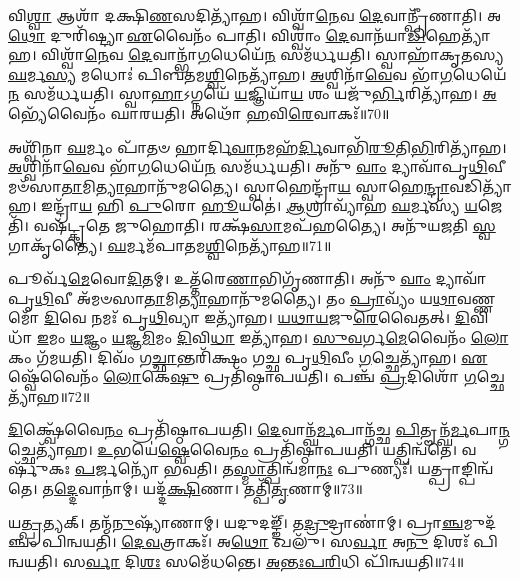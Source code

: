 𑌵𑌿\-\ul{𑌶𑍍𑌵𑌾} 𑌆𑌶𑌾᳴ 𑌦𑌕𑍍𑌷𑌿\-\ul{𑌣}\-𑌸𑌦𑌿𑌤𑍍𑌯𑌾᳴𑌹। 
𑌵𑌿𑌶𑍍𑌵𑌾᳴\-\ul{𑌨𑍇}\-𑌵 \ul{𑌦𑍇}\-𑌵𑌾𑌨𑍍𑌪𑍍𑌰𑍀᳴𑌣𑌾𑌤𑌿। 
𑌅\-\ul{𑌥𑍋} 𑌦𑍁𑌰𑌿᳴𑌷𑍍𑌟𑍍𑌯𑌾 \ul{𑌏}\-𑌵𑍈𑌨𑌂᳴ 𑌪𑌾𑌤𑌿। 
𑌵𑌿𑌶𑍍𑌵𑌾𑌂॑ \ul{𑌦𑍇}\-𑌵𑌾𑌨᳴𑌯𑌾\-\ul{𑌡𑌿}\-𑌹𑍇𑌤𑍍𑌯𑌾᳴𑌹। 
𑌵𑌿𑌶𑍍𑌵𑌾᳴\-\ul{𑌨𑍇}\-𑌵 \ul{𑌦𑍇}\-𑌵𑌾𑌨𑍍𑌭𑌾᳴\-\ul{𑌗}\-𑌧𑍇𑌯𑍇᳴\-\ul{𑌨} 𑌸𑌮᳴𑌰𑍍𑌧𑌯𑌤𑌿। 
𑌸𑍍𑌵𑌾𑌹𑌾᳴𑌕𑍃𑌤𑌸𑍍𑌯 \ul{𑌘}\-𑌰𑍍𑌮\-\ul{𑌸𑍍𑌯} 𑌮𑌧𑍋𑌃॑ 𑌪𑌿𑌬𑌤𑌮\-\ul{𑌶𑍍𑌵𑌿}\-𑌨𑍇𑌤𑍍𑌯𑌾᳴𑌹। 
\-\ul{𑌅}\-𑌶𑍍𑌵𑌿𑌨𑌾᳴\-\ul{𑌵𑍇}\-𑌵 𑌭𑌾᳴\-\ul{𑌗}\-𑌧𑍇𑌯𑍇᳴\-\ul{𑌨} 𑌸𑌮᳴𑌰𑍍𑌧𑌯𑌤𑌿। 
𑌸𑍍𑌵𑌾\-\ul{𑌹𑌾}\-𑌽𑌗𑍍𑌨𑌯𑍇᳴ \ul{𑌯}\-𑌜𑍍𑌞𑌿𑌯𑌾᳴\-\ul{𑌯} 𑌶𑌂 𑌯𑌜𑍁᳴\-\ul{𑌰𑍍𑌭𑌿}\-𑌰𑌿𑌤𑍍𑌯𑌾᳴𑌹। 
\-\ul{𑌅}\-𑌭𑍍𑌯𑍇᳴𑌵𑍈𑌨𑌂᳴ 𑌘𑌾𑌰𑌯𑌤𑌿। 
𑌅𑌥𑍋᳴ \ul{𑌹}\-𑌵𑌿\-\ul{𑌰𑍇}\-𑌵𑌾𑌕𑌃᳴॥70॥

𑌅𑌶𑍍𑌵𑌿᳴𑌨𑌾 \ul{𑌘}\-𑌰𑍍𑌮𑌂 𑌪𑌾᳴𑌤𑍞 𑌹𑌾𑌰𑍍𑌦𑌿\-\ul{𑌵𑌾}\-𑌨𑌮𑌹᳴\-\ul{𑌰𑍍𑌦𑌿}\-𑌵𑌾𑌭𑌿᳴\-\ul{𑌰𑍂}\-𑌤𑌿\-\ul{𑌭𑌿}\-𑌰𑌿𑌤𑍍𑌯𑌾᳴𑌹। 
\-\ul{𑌅}\-𑌶𑍍𑌵𑌿𑌨𑌾᳴\-\ul{𑌵𑍇}\-𑌵 𑌭𑌾᳴\-\ul{𑌗}\-𑌧𑍇𑌯𑍇᳴\-\ul{𑌨} 𑌸𑌮᳴𑌰𑍍𑌧𑌯𑌤𑌿। 
𑌅𑌨𑍁᳴ \ul{𑌵𑌾𑌂} 𑌦𑍍𑌯𑌾𑌵𑌾᳴𑌪𑍃\-\ul{𑌥𑌿}\-𑌵𑍀 𑌮𑍞᳴𑌸𑌾\-\ul{𑌤𑌾}\-𑌮𑌿\-\ul{𑌤𑍍𑌯𑌾}\-𑌹𑌾𑌨𑍁᳴𑌮𑌤𑍍𑌯𑍈। 
𑌸𑍍𑌵𑌾𑌹𑍇𑌨𑍍𑌦𑍍𑌰𑌾᳴\-\ul{𑌯} 𑌸𑍍𑌵𑌾𑌹𑍇\-\ul{𑌨𑍍𑌦𑍍𑌰𑌾}\-𑌵𑌡𑌿𑌤𑍍𑌯𑌾᳴𑌹। 
𑌇𑌨𑍍𑌦𑍍𑌰𑌾᳴\-\ul{𑌯} 𑌹𑌿 \ul{𑌪𑍁}\-𑌰𑍋 \ul{𑌹𑍂}\-𑌯𑌤𑍇॑। 
\-\ul{𑌆}\-𑌶𑍍𑌰𑌾𑌵𑍍𑌯𑌾᳴𑌹 \ul{𑌘}\-𑌰𑍍𑌮𑌸𑍍𑌯᳴ \ul{𑌯}\-𑌜𑍇𑌤𑌿᳴। 
𑌵𑌷᳴𑌟𑍍𑌕𑍃𑌤𑍇 𑌜𑍁𑌹𑍋𑌤𑌿। 
𑌰𑌕𑍍𑌷᳴\-\ul{𑌸𑌾}\-𑌮𑌪᳴𑌹𑌤𑍍𑌯𑍈। 
𑌅𑌨𑍁᳴𑌯𑌜𑌤𑌿 \ul{𑌸𑍍𑌵}\-𑌗𑌾𑌕𑍃᳴𑌤𑍍𑌯𑍈। 
\-\ul{𑌘}\-𑌰𑍍𑌮𑌮᳴𑌪𑌾𑌤𑌮\-\ul{𑌶𑍍𑌵𑌿}\-𑌨𑍇𑌤𑍍𑌯𑌾᳴𑌹॥71॥

𑌪𑍂𑌰𑍍𑌵᳴\-\ul{𑌮𑍇}\-𑌵𑍋\-\ul{𑌦𑌿}\-𑌤𑌮𑍍। 
𑌉𑌤𑍍𑌤᳴𑌰𑍇\-\ul{𑌣𑌾}\-𑌭𑌿𑌗𑍃᳴𑌣𑌾𑌤𑌿। 
𑌅𑌨𑍁᳴ \ul{𑌵𑌾𑌂} 𑌦𑍍𑌯𑌾𑌵𑌾᳴𑌪𑍃\-\ul{𑌥𑌿}\-𑌵𑍀 𑌅᳴𑌮𑍞𑌸𑌾\-\ul{𑌤𑌾}\-𑌮𑌿\-\ul{𑌤𑍍𑌯𑌾}\-𑌹𑌾𑌨𑍁᳴𑌮𑌤𑍍𑌯𑍈। 
𑌤𑌂 \ul{𑌪𑍍𑌰𑌾}\-𑌵𑍍𑌯𑌂᳴ 𑌯\-\ul{𑌥𑌾}\-𑌵𑌣𑍍𑌣𑌮𑍋᳴ \ul{𑌦𑌿}\-𑌵𑍇 𑌨𑌮𑌃᳴ 𑌪𑍃\-\ul{𑌥𑌿}\-𑌵𑍍𑌯𑌾 𑌇𑌤𑍍𑌯𑌾᳴𑌹। 
\-\ul{𑌯}\-\-\ul{𑌥𑌾}\-\-\ul{𑌯}\-𑌜𑍁\-\ul{𑌰𑍇}\-𑌵𑍈𑌤𑌤𑍍। 
\-\ul{𑌦𑌿}\-𑌵𑌿𑌧𑌾᳴ \ul{𑌇}\-𑌮𑌂 \ul{𑌯}\-𑌜𑍍𑌞𑌂 \ul{𑌯}\-𑌜𑍍𑌞\-\ul{𑌮𑌿}\-𑌮𑌂 \ul{𑌦𑌿}\-𑌵𑌿\-\ul{𑌧𑌾} 𑌇𑌤𑍍𑌯𑌾᳴𑌹। 
\-\ul{𑌸𑍁}\-\-\ul{𑌵}\-𑌰𑍍𑌗\-\ul{𑌮𑍇}\-𑌵𑍈𑌨𑌂᳴ \ul{𑌲𑍋}\-𑌕𑌂 𑌗᳴𑌮𑌯𑌤𑌿। 
𑌦𑌿𑌵𑌂᳴ 𑌗\-\ul{𑌚𑍍𑌛𑌾}\-𑌨𑍍𑌤𑌰𑌿᳴𑌕𑍍𑌷𑌂 𑌗𑌚𑍍𑌛 𑌪𑍃\-\ul{𑌥𑌿}\-𑌵𑍀𑌂 \ul{𑌗}\-𑌚𑍍𑌛𑍇𑌤𑍍𑌯𑌾᳴𑌹। 
\-\ul{𑌏}\-𑌷𑍍𑌵𑍇᳴𑌵𑍈𑌨𑌂᳴ \ul{𑌲𑍋}\-𑌕𑍇\-\ul{𑌷𑍁} 𑌪𑍍𑌰𑌤𑌿᳴𑌷𑍍𑌠𑌾𑌪𑌯𑌤𑌿। 
𑌪𑌞𑍍𑌚᳴ \ul{𑌪𑍍𑌰}\-𑌦𑌿𑌶𑍋᳴ \ul{𑌗}\-𑌚𑍍𑌛𑍇𑌤𑍍𑌯𑌾᳴𑌹॥72॥

\-\ul{𑌦𑌿}\-𑌕𑍍𑌷𑍍𑌵𑍇᳴𑌵𑍈\-\ul{𑌨𑌂} 𑌪𑍍𑌰𑌤𑌿᳴𑌷𑍍𑌠𑌾𑌪𑌯𑌤𑌿। 
\-\ul{𑌦𑍇}\-𑌵𑌾𑌨𑍍𑌘᳴\-\ul{𑌰𑍍𑌮}\-𑌪𑌾𑌨𑍍𑌗᳴𑌚𑍍𑌛 \ul{𑌪𑌿}\-𑌤𑍄𑌨𑍍𑌘᳴\-\ul{𑌰𑍍𑌮}\-\-𑌪𑌾\-\ul{𑌨𑍍𑌗}\-𑌚𑍍𑌛𑍇\-𑌤𑍍𑌯𑌾᳴𑌹। 
\-\ul{𑌉}\-𑌭𑌯𑍇॑\-\ul{𑌷𑍍𑌵𑍇}\-𑌵𑍈\-\ul{𑌨𑌂} 𑌪𑍍𑌰𑌤𑌿᳴𑌷𑍍𑌠𑌾𑌪𑌯𑌤𑌿। 
𑌯𑌤𑍍𑌪𑌿𑌨𑍍𑌵᳴𑌤𑍇। 
𑌵𑌰𑍍\mbox{}𑌷𑍁᳴𑌕𑌃 \ul{𑌪}\-𑌰𑍍𑌜𑌨𑍍𑌯𑍋᳴ 𑌭𑌵𑌤𑌿। 
𑌤\-\ul{𑌸𑍍𑌮𑌾}\-𑌤𑍍𑌪𑌿𑌨𑍍𑌵᳴𑌮𑌾\-\ul{𑌨𑌃} 𑌪𑍁𑌣𑍍𑌯𑌃᳴। 
𑌯𑌤𑍍𑌪𑍍𑌰𑌾𑌙𑍍𑌪𑌿𑌨𑍍𑌵᳴𑌤𑍇। 
𑌤\-\ul{𑌦𑍍𑌦𑍇}\-𑌵𑌾𑌨𑌾॑𑌮𑍍। 
𑌯𑌦𑍍𑌦᳴\-\ul{𑌕𑍍𑌷𑌿}\-𑌣𑌾। 
𑌤𑌤𑍍𑌪𑌿᳴\-\ul{𑌤𑍃}\-𑌣𑌾𑌮𑍍॥73॥

𑌯\-\ul{𑌤𑍍𑌪𑍍𑌰}\-𑌤𑍍𑌯𑌕𑍍। 
𑌤𑌨𑍍𑌮᳴\-\ul{𑌨𑍁}\-𑌷𑍍𑌯𑌾᳴𑌣𑌾𑌮𑍍। 
𑌯𑌦𑍁𑌦𑌙𑍍𑌙𑍍᳴। 
𑌤\-\ul{𑌦𑍍𑌰𑍁}\-𑌦𑍍𑌰𑌾𑌣𑌾॑𑌮𑍍। 
𑌪𑍍𑌰𑌾\-\ul{𑌞𑍍𑌚}\-𑌮𑍁𑌦᳴𑌞𑍍𑌚𑌂 𑌪𑌿𑌨𑍍𑌵𑌯𑌤𑌿। 
\-\ul{𑌦𑍇}\-\-\ul{𑌵}\-𑌤𑍍𑌰𑌾𑌕𑌃᳴। 
𑌅\-\ul{𑌥𑍋} 𑌖𑌲𑍁᳴। 
𑌸\-\ul{𑌰𑍍𑌵𑌾} 𑌅\-\ul{𑌨𑍁} 𑌦𑌿𑌶𑌃᳴ 𑌪𑌿𑌨𑍍𑌵𑌯𑌤𑌿। 
𑌸\-\ul{𑌰𑍍𑌵𑌾} 𑌦𑌿\-\ul{𑌶𑌃} 𑌸𑌮𑍇᳴𑌧𑌨𑍍𑌤𑍇। 
\-\ul{𑌅}\-\-\ul{𑌨𑍍𑌤𑌃}\-\-\ul{𑌪}\-\-\ul{𑌰𑌿}\-𑌧𑌿 𑌪𑌿᳴𑌨𑍍𑌵𑌯𑌤𑌿॥74॥

